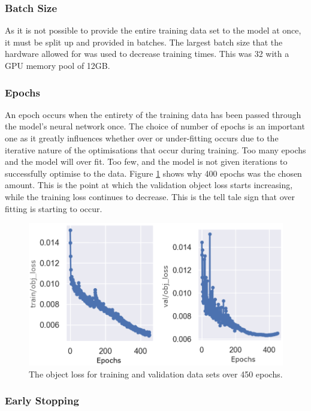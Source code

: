 \documentclass{thesis}
\begin{document}
\subsubsection{Batch Size} 

As it is not possible to provide the entire training data set to the model at once, it must be split up and provided in batches. The largest batch size that the hardware allowed for was used to decrease training times. This was 32 with a GPU memory pool of 12GB.

\subsubsection{Epochs} 

An epoch occurs when the entirety of the training data has been passed through the model's neural network once. The choice of number of epochs is an important one as it greatly influences whether over or under-fitting occurs due to the iterative nature of the optimisations that occur during training. Too many epochs and the model will over fit. Too few, and the model is not given iterations to successfully optimise to the data. Figure \ref{fig:epochs} shows why 400 epochs was the chosen amount. This is the point at which the validation object loss starts increasing, while the training loss continues to decrease. This is the tell tale sign that over fitting is starting to occur.

\begin{figure}[h]
    \centering
    \includegraphics[scale=0.45]{images/train-val-obj-loss.png}
    \caption{The object loss for training and validation data sets over 450 epochs.}
    \label{fig:epochs}
\end{figure}

\subsubsection{Early Stopping}
\end{document}
